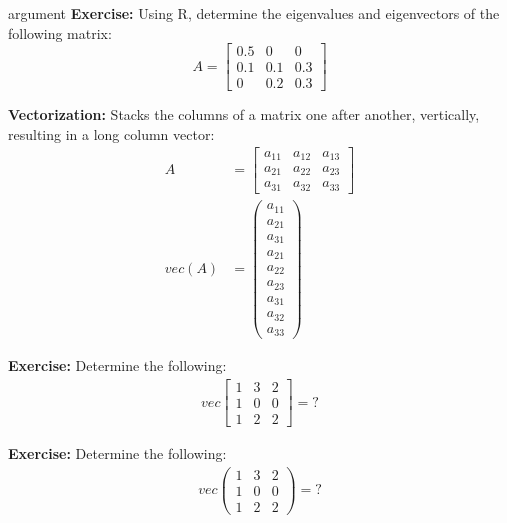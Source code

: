 \begin{labeling}{argument}
    \textbf{Exercise:} Using R, determine the eigenvalues and eigenvectors of the following matrix:
    \[
        A = \begin{bmatrix}
            0.5 & 0   & 0   \\
            0.1 & 0.1 & 0.3 \\
            0   & 0.2 & 0.3
        \end{bmatrix}
    \]

    \begin{sol}
        
    \end{sol}

    \item[\textbf{Vectorization:}] Stacks the columns of a matrix one after another, vertically, resulting in a long column vector:
    \begin{align*}
        A
         & = \begin{bmatrix}
                 a_{11} & a_{12} & a_{13} \\
                 a_{21} & a_{22} & a_{23} \\
                 a_{31} & a_{32} & a_{33}
             \end{bmatrix}
        \\
        vec(A)
         & = \begin{pmatrix}
                 a_{11} \\ a_{21} \\ a_{31} \\
                 a_{21} \\ a_{22} \\ a_{23} \\
                 a_{31} \\ a_{32} \\ a_{33}
             \end{pmatrix}
    \end{align*}

    \textbf{Exercise:} Determine the following:
    \begin{align*}
        vec \begin{bmatrix}
                1 & 3 & 2 \\
                1 & 0 & 0 \\
                1 & 2 & 2
            \end{bmatrix}
        =
        ?
    \end{align*}

    \textbf{Exercise:} Determine the following:
    \begin{align*}
        vec \begin{pmatrix}
                1 & 3 & 2 \\
                1 & 0 & 0 \\
                1 & 2 & 2
            \end{pmatrix}
        =
        ?
    \end{align*}


\end{labeling}
